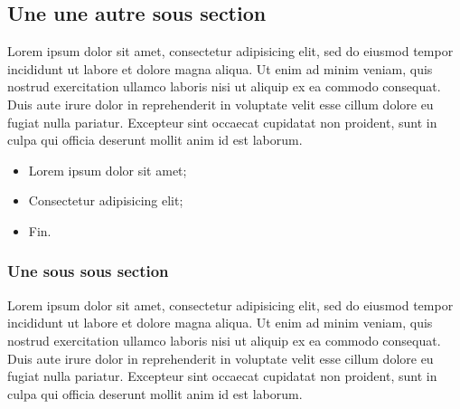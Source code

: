 %
\subsection{Une une autre sous section}
Lorem ipsum dolor sit amet, consectetur adipisicing elit, sed do eiusmod
tempor incididunt ut labore et dolore magna aliqua. Ut enim ad minim veniam,
quis nostrud exercitation ullamco laboris nisi ut aliquip ex ea commodo
consequat. Duis aute irure dolor in reprehenderit in voluptate velit esse
cillum dolore eu fugiat nulla pariatur. Excepteur sint occaecat cupidatat non
proident, sunt in culpa qui officia deserunt mollit anim id est laborum.


\begin{itemize}
	\item Lorem ipsum dolor sit amet;
	\item Consectetur adipisicing elit;
	\item Fin.
\end{itemize}
%
\subsubsection{Une sous sous section}
Lorem ipsum dolor sit amet, consectetur adipisicing elit, sed do eiusmod
tempor incididunt ut labore et dolore magna aliqua. Ut enim ad minim veniam,
quis nostrud exercitation ullamco laboris nisi ut aliquip ex ea commodo
consequat. Duis aute irure dolor in reprehenderit in voluptate velit esse
cillum dolore eu fugiat nulla pariatur. Excepteur sint occaecat cupidatat non
proident, sunt in culpa qui officia deserunt mollit anim id est laborum.

